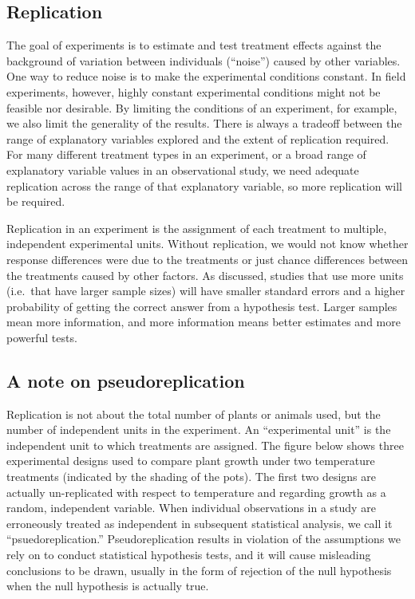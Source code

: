 \documentclass[]{book}
\begin{document}
\hypertarget{replication}{%
\subsection{Replication}\label{replication}}

The goal of experiments is to estimate and test treatment effects against the background of variation between individuals (``noise'') caused by other variables. One way to reduce noise is to make the experimental conditions constant. In field experiments, however, highly constant experimental conditions might not be feasible nor desirable. By limiting the conditions of an experiment, for example, we also limit the generality of the results. There is always a tradeoff between the range of explanatory variables explored and the extent of replication required. For many different treatment types in an experiment, or a broad range of explanatory variable values in an observational study, we need adequate replication across the range of that explanatory variable, so more replication will be required.

Replication in an experiment is the assignment of each treatment to multiple, independent experimental units. Without replication, we would not know whether response differences were due to the treatments or just chance differences between the treatments caused by other factors. As discussed, studies that use more units (i.e.~that have larger sample sizes) will have smaller standard errors and a higher probability of getting the correct answer from a hypothesis test. Larger samples mean more information, and more information means better estimates and more powerful tests.

\hypertarget{a-note-on-pseudoreplication}{%
\subsection{A note on pseudoreplication}\label{a-note-on-pseudoreplication}}

Replication is not about the total number of plants or animals used, but the number of independent units in the experiment. An ``experimental unit'' is the independent unit to which treatments are assigned. The figure below shows three experimental designs used to compare plant growth under two temperature treatments (indicated by the shading of the pots). The first two designs are actually un-replicated with respect to temperature and regarding growth as a random, independent variable. When individual observations in a study are erroneously treated as independent in subsequent statistical analysis, we call it ``psuedoreplication.'' Pseudoreplication results in violation of the assumptions we rely on to conduct statistical hypothesis tests, and it will cause misleading conclusions to be drawn, usually in the form of rejection of the null hypothesis when the null hypothesis is actually true.
\end{document}
